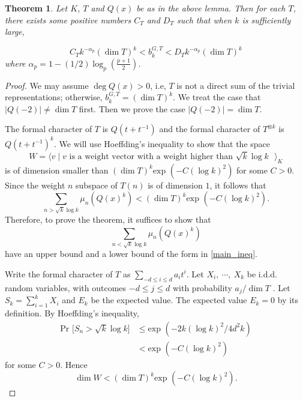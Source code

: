 \documentclass[11 pt]{amsart}
\theoremstyle{plain}
\newtheorem{thm}{Theorem}[section]
\theoremstyle{definition}
\theoremstyle{remark}
\def\xx{\otimes}
\def\exp{\text{exp }}
\def\m{\mu}
\begin{document}
\begin{thm}
    Let $K$, $T$ and $Q(x)$ be as in the above lemma. Then for each $T$, there exists some positive numbers $C_T$ and $D_T$ such that when $k$ is sufficiently large, 

    \begin{equation} \label{main_ineq}
        C_Tk^{-\alpha_p} (\dim T)^k < b_k^{G, T}< D_T k^{-\alpha_p}(\dim T)^k    
    \end{equation}
    where $\alpha_p=1-(1/2)\log_p(\frac{p+1}{2})$.    
    
\end{thm}

\begin{proof}
    We may assume $\deg Q(x)>0$, i.e, $T$ is not a direct sum of the trivial representations; otherwise, $b_k^{G, T}=(\dim T)^k.$  We treat the case that $\vert Q(-2) \vert \neq \dim T$ first. Then we prove the case $\vert Q(-2) \vert = \dim T$.

    The formal character of $T$ is $Q(t+t^{-1})$ and the formal character of $T^{\xx k}$ is $Q(t+t^{-1})^k$. We will use Hoeffding's inequality to show that the space
    \begin{equation*}
        W=\langle v \mid v \text{ is a weight vector with a weight higher than $\sqrt{k}\log k$ } \rangle_K
    \end{equation*}
    is of dimension smaller than $(\dim T)^k\exp( -C (\log k)^2)$ for some  $C>0$. Since the weight $n$ subspace of $T(n)$ is of dimension $1$, it follows that $$\sum_{n> \sqrt{k}\log k } \m_n (Q(x)^k)<(\dim T)^k\exp( -C (\log k)^2).$$ Therefore, to prove the theorem, it suffices to show that $$\sum_{n< \sqrt{k}\log k } \m_n (Q(x)^k)$$ have an upper bound and a lower bound of the form in \eqref{main_ineq}.
    
    Write the formal character of $T$ as $\sum_{-d \le i \le d} a_i t^i$.  Let $X_i,\ \cdots,\ X_k$ be i.d.d. random variables, with outcomes $-d\le j\le d$ with probability $a_j/\dim T$ . Let $S_k=\sum_{i=1}^k X_i$ and $E_k$ be the expected value. The expected value $E_k=0$ by its definition. By Hoeffding's inequality, \begin{align*}
        \text{Pr } \big[  S_n > \sqrt{k}\log k \big] &\le  \exp (-2k(\log k)^2/4d^2k) \\
        &<\exp(-C(\log k)^2)
    \end{align*}
 for some $C>0.$
    Hence $$\dim W < (\dim T)^k\exp( -C (\log k)^2).$$ 



\end{proof}
\end{document}
